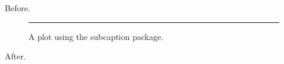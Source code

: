 \documentclass{beamer}
\begin{document}
\begin{frame}[plain,t]
Before.\begin{figure}\rule{40pt}{12pt}\caption*{A plot using the subcaption package.}\end{figure}After.
\end{frame}
\end{document}
